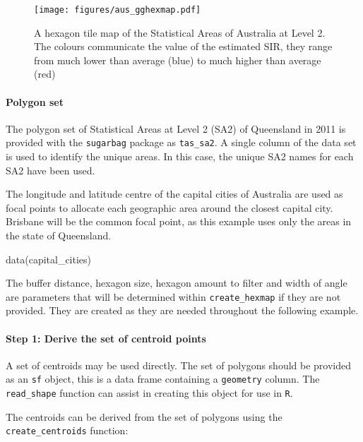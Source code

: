 \begin{figure}[h]
\centering
\texttt{[image: figures/aus\_gghexmap.pdf]}
\caption{\label{fig:melanoma-hex}A hexagon tile map of the Statistical Areas of Australia at Level 2. The colours communicate the value of the estimated SIR, they range from much lower than average (blue) to much higher than average (red)}
\end{figure}

\hypertarget{polygon-set}{%
\paragraph{Polygon set}\label{polygon-set}}

The polygon set of Statistical Areas at Level 2 (SA2) \citep{abs2011} of
Queensland in 2011 is provided with the \texttt{sugarbag} package as
\texttt{tas\_sa2}. A single column of the data set is used to identify
the unique areas. In this case, the unique SA2 names for each SA2 have
been used.

The longitude and latitude centre of the capital cities of Australia are
used as focal points to allocate each geographic area around the closest
capital city. Brisbane will be the common focal point, as this example
uses only the areas in the state of Queensland.

\begin{Schunk}
\begin{Sinput}
data(capital_cities)
\end{Sinput}
\end{Schunk}

The buffer distance, hexagon size, hexagon amount to filter and width of
angle are parameters that will be determined within
\texttt{create\_hexmap} if they are not provided. They are created as
they are needed throughout the following example.

\hypertarget{step-1-derive-the-set-of-centroid-points}{%
\paragraph{Step 1: Derive the set of centroid
points}\label{step-1-derive-the-set-of-centroid-points}}

A set of centroids may be used directly. The set of polygons should be
provided as an \texttt{sf} object, this is a data frame containing a
\texttt{geometry} column. The \texttt{read\_shape} function can assist
in creating this object for use in \texttt{R}.

The centroids can be derived from the set of polygons using the
\texttt{create\_centroids} function:

